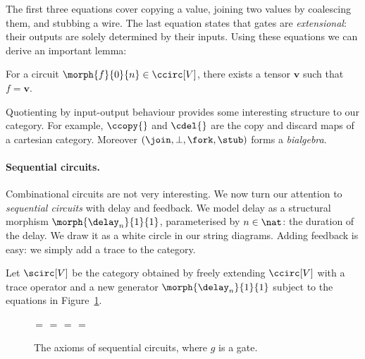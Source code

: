 \documentclass[11pt,numbib]{article}
\begin{document}
\noindent
The first three equations cover copying a value, joining two values by coalescing them, and stubbing a wire.
The last equation states that gates are \emph{extensional}: their outputs are solely determined by their inputs.
Using these equations we can derive an important lemma:

\begin{lemma}[Extensionality]
    For a circuit $\morph{f}{0}{n} \in \ccirc[V]$, there exists a tensor $\textbf{v}$ such that $f = \textbf{v}$.
\end{lemma}

\noindent
Quotienting by input-output behaviour provides some interesting structure to our category.
For example, $\ccopy{}$ and $\cdel{}$ are the copy and discard maps of a cartesian category.
Moreover $(\join,\bot,\fork,\stub)$ forms a \emph{bialgebra}.

\paragraph*{Sequential circuits.}

Combinational circuits are not very interesting.
We now turn our attention to \emph{sequential circuits} with delay and feedback.
We model delay as a structural morphism $\morph{\delay_n}{1}{1}$, parameterised by $n \in \nat$: the duration of the delay.
We draw it as a white circle in our string diagrams.
Adding feedback is easy: we simply add a trace to the category.

\begin{definition}
    Let $\scirc[V]$ be the category obtained by freely extending $\ccirc[V]$ with a trace operator and a new generator $\morph{\delay_n}{1}{1}$ subject to the equations in Figure~\ref{fig:sequential}.
\end{definition}

\begin{figure}
    \centering
    \,=\,
    \quad
    \,=\,
    \quad
    \,=\,
    \quad
    \,=\,
    \caption{The axioms of sequential circuits, where $g$ is a gate.}
    \label{fig:sequential}
\end{figure}
\end{document}
